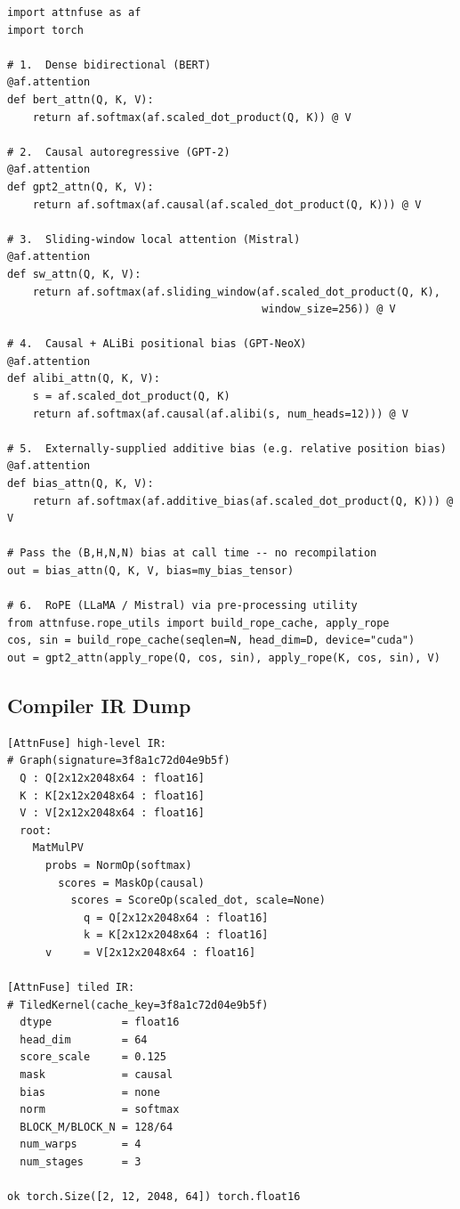 \documentclass[12pt]{article}
\begin{document}
\begin{lstlisting}[caption={All five AttnFuse attention variants in pure
  Python.  No CUDA or Triton expertise is required.},label={lst:dsl}]
import attnfuse as af
import torch

# 1.  Dense bidirectional (BERT)
@af.attention
def bert_attn(Q, K, V):
    return af.softmax(af.scaled_dot_product(Q, K)) @ V

# 2.  Causal autoregressive (GPT-2)
@af.attention
def gpt2_attn(Q, K, V):
    return af.softmax(af.causal(af.scaled_dot_product(Q, K))) @ V

# 3.  Sliding-window local attention (Mistral)
@af.attention
def sw_attn(Q, K, V):
    return af.softmax(af.sliding_window(af.scaled_dot_product(Q, K),
                                        window_size=256)) @ V

# 4.  Causal + ALiBi positional bias (GPT-NeoX)
@af.attention
def alibi_attn(Q, K, V):
    s = af.scaled_dot_product(Q, K)
    return af.softmax(af.causal(af.alibi(s, num_heads=12))) @ V

# 5.  Externally-supplied additive bias (e.g. relative position bias)
@af.attention
def bias_attn(Q, K, V):
    return af.softmax(af.additive_bias(af.scaled_dot_product(Q, K))) @ V

# Pass the (B,H,N,N) bias at call time -- no recompilation
out = bias_attn(Q, K, V, bias=my_bias_tensor)

# 6.  RoPE (LLaMA / Mistral) via pre-processing utility
from attnfuse.rope_utils import build_rope_cache, apply_rope
cos, sin = build_rope_cache(seqlen=N, head_dim=D, device="cuda")
out = gpt2_attn(apply_rope(Q, cos, sin), apply_rope(K, cos, sin), V)
\end{lstlisting}

\subsection{Compiler IR Dump}

\begin{lstlisting}[style=terminal,
  caption={ATTNFUSE\_DEBUG=1 output for GPT-2 causal ($B{=}2,H{=}12,
    N{=}2048,D{=}64$, fp16).}]
[AttnFuse] high-level IR:
# Graph(signature=3f8a1c72d04e9b5f)
  Q : Q[2x12x2048x64 : float16]
  K : K[2x12x2048x64 : float16]
  V : V[2x12x2048x64 : float16]
  root:
    MatMulPV
      probs = NormOp(softmax)
        scores = MaskOp(causal)
          scores = ScoreOp(scaled_dot, scale=None)
            q = Q[2x12x2048x64 : float16]
            k = K[2x12x2048x64 : float16]
      v     = V[2x12x2048x64 : float16]

[AttnFuse] tiled IR:
# TiledKernel(cache_key=3f8a1c72d04e9b5f)
  dtype           = float16
  head_dim        = 64
  score_scale     = 0.125
  mask            = causal
  bias            = none
  norm            = softmax
  BLOCK_M/BLOCK_N = 128/64
  num_warps       = 4
  num_stages      = 3

ok torch.Size([2, 12, 2048, 64]) torch.float16
\end{lstlisting}
\end{document}
